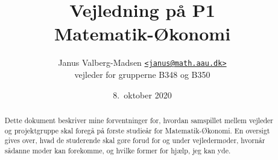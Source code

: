 \documentclass[12pt,a4paper,oneside,final]{article}
\title{
  Vejledning p{\aa} P1\\
  Matematik-{\O}konomi
}
\author{
  Janus Valberg-Madsen \href{mailto:janus@math.aau.dk}{\texttt{<janus@math.aau.dk>}}\\
  vejleder for grupperne B348 og B350
}
\date{8.\ oktober 2020}
\begin{document}
\maketitle

\renewcommand{\abstractname}{Om dette dokument}
\begin{abstract}
  Dette dokument beskriver mine forventninger for, hvordan samspillet mellem vejleder og projektgruppe skal foregå på første studieår for Matematik-Økonomi.
  En oversigt gives over, hvad de studerende skal gøre forud for og under vejledermøder, hvornår sådanne møder kan forekomme, og hvilke former for hjælp, jeg kan yde.
\end{abstract}








\end{document}
